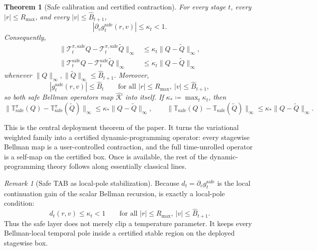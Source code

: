 \documentclass{article}
\newtheorem{theorem}{Theorem}[section]
\theoremstyle{remark}
\newtheorem{remark}[remark]{Remark}
\newcommand{\defeq}{\coloneqq}
\newcommand{\cT}{\mathcal{T}}
\newcommand{\safe}{\mathrm{safe}}
\newcommand{\Ksafe}{\widehat{\mathcal K}}
\newcommand{\Bhat}{\widehat B}
\begin{document}
\begin{theorem}[Safe calibration and certified contraction]
\label{thm:safe-calibration}
For every stage $t$, every $|r|\le R_{\max}$, and every $|v|\le \Bhat_{t+1}$,
\begin{equation}
\left|\partial_v g_t^{\safe}(r,v)\right| \le \kappa_t <1.
\label{eq:safe-derivative-bound}
\end{equation}
Consequently,
\begin{align}
\|\cT_t^{\pi,\safe}Q - \cT_t^{\pi,\safe}\widetilde Q\|_\infty
&\le \kappa_t\|Q-\widetilde Q\|_\infty,
\label{eq:safe-policy-contraction}\\
\|\cT_t^{\safe}Q - \cT_t^{\safe}\widetilde Q\|_\infty
&\le \kappa_t\|Q-\widetilde Q\|_\infty
\label{eq:safe-opt-contraction}
\end{align}
whenever $\|Q\|_\infty,\|\widetilde Q\|_\infty\le \Bhat_{t+1}$.
Moreover,
\begin{equation}
|g_t^{\safe}(r,v)| \le \Bhat_t
\qquad \text{for all } |r|\le R_{\max},\ |v|\le \Bhat_{t+1},
\label{eq:safe-range-bound}
\end{equation}
so both safe Bellman operators map $\Ksafe$ into itself.
If $\kappa_*\defeq \max_t \kappa_t$, then
\begin{equation}
\|\mathbb T_\safe^\pi(Q)-\mathbb T_\safe^\pi(\widetilde Q)\|_\infty
\le \kappa_*\|Q-\widetilde Q\|_\infty,
\qquad
\|\mathbb T_\safe(Q)-\mathbb T_\safe(\widetilde Q)\|_\infty
\le \kappa_*\|Q-\widetilde Q\|_\infty.
\label{eq:safe-global-contraction}
\end{equation}
\end{theorem}

This is the central deployment theorem of the paper.
It turns the variational weighted family into a certified dynamic-programming operator: every stagewise Bellman map is a user-controlled contraction, and the full time-unrolled operator is a self-map on the certified box.
Once  is available, the rest of the dynamic-programming theory follows along essentially classical lines.

\begin{remark}[Safe TAB as local-pole stabilization]
\label{rem:pole-stabilization}
Because $d_t=\partial_v g_t^{\safe}$ is the local continuation gain of the scalar Bellman recursion,  is exactly a local-pole condition:
\[
d_t(r,v)\le \kappa_t<1
\qquad
\text{for all } |r|\le R_{\max},\ |v|\le \Bhat_{t+1}.
\]
Thus the safe layer does not merely clip a temperature parameter. It keeps every Bellman-local temporal pole inside a certified stable region on the deployed stagewise box.
\end{remark}
\end{document}
